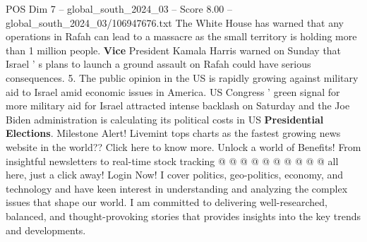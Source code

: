 \begin{textsample}{POS Dim 7 – global\_south\_2024\_03 – Score 8.00 – global\_south\_2024\_03/106947676.txt}
The White House has warned that any operations in Rafah can lead to a massacre as the small territory is holding more than 1 million people. \textbf{Vice} President Kamala Harris warned on Sunday that Israel ' s plans to launch a ground assault on Rafah could have serious consequences. 5.
The public opinion in the US is rapidly growing against military aid to Israel amid economic issues in America.
US Congress ' green signal for more military aid for Israel attracted intense backlash on Saturday and the Joe Biden administration is calculating its political costs in US \textbf{Presidential} \textbf{Elections}.
Milestone Alert!
Livemint tops charts as the fastest growing news website in the world??
Click here to know more.
Unlock a world of Benefits!
From insightful newsletters to real-time stock tracking @ @ @ @ @ @ @ @ @ @ all here, just a click away!
Login Now!
I cover politics, geo-politics, economy, and technology and have keen interest in understanding and analyzing the complex issues that shape our world.
I am committed to delivering well-researched, balanced, and thought-provoking stories that provides insights into the key trends and developments.

\end{textsample}
